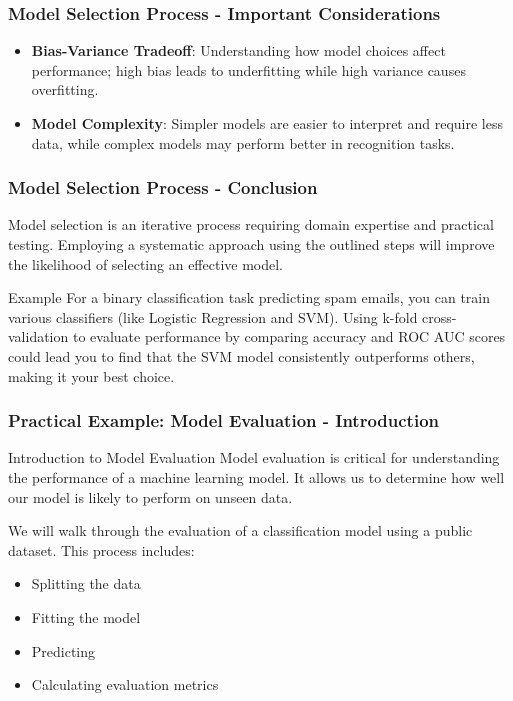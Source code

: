 \documentclass[aspectratio=169]{beamer}
\begin{document}
\begin{frame}[fragile]
    \frametitle{Model Selection Process - Important Considerations}
    \begin{itemize}
        \item \textbf{Bias-Variance Tradeoff}: Understanding how model choices affect performance; high bias leads to underfitting while high variance causes overfitting.
        \item \textbf{Model Complexity}: Simpler models are easier to interpret and require less data, while complex models may perform better in recognition tasks.
    \end{itemize}
\end{frame}

\begin{frame}[fragile]
    \frametitle{Model Selection Process - Conclusion}
    Model selection is an iterative process requiring domain expertise and practical testing. Employing a systematic approach using the outlined steps will improve the likelihood of selecting an effective model.

    \begin{block}{Example}
        For a binary classification task predicting spam emails, you can train various classifiers (like Logistic Regression and SVM). Using k-fold cross-validation to evaluate performance by comparing accuracy and ROC AUC scores could lead you to find that the SVM model consistently outperforms others, making it your best choice.
    \end{block}
\end{frame}

\begin{frame}[fragile]
    \frametitle{Practical Example: Model Evaluation - Introduction}
    \begin{block}{Introduction to Model Evaluation}
        Model evaluation is critical for understanding the performance of a machine learning model. 
        It allows us to determine how well our model is likely to perform on unseen data.
    \end{block}
    We will walk through the evaluation of a classification model using a public dataset. 
    This process includes:
    \begin{itemize}
        \item Splitting the data
        \item Fitting the model
        \item Predicting
        \item Calculating evaluation metrics
    \end{itemize}
\end{frame}
\end{document}
